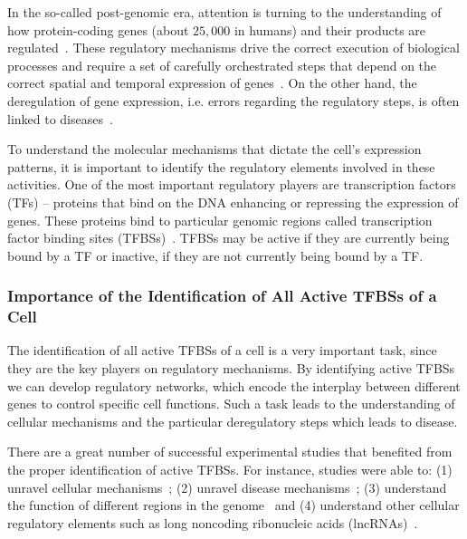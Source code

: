 In the so-called post-genomic era, attention is turning to the understanding of how protein-coding genes (about $25,000$ in humans) and their products are regulated~\citep{maston2006}. These regulatory mechanisms drive the correct execution of biological processes and require a set of carefully orchestrated steps that depend on the correct spatial and temporal expression of genes~\citep{maston2006}. On the other hand, the deregulation of gene expression, i.e. errors regarding the regulatory steps, is often linked to diseases~\citep{encode2012}.

To understand the molecular mechanisms that dictate the cell's expression patterns, it is important to identify the regulatory elements involved in these activities. One of the most important regulatory players are transcription factors (TFs) -- proteins that bind on the DNA enhancing or repressing the expression of genes. These proteins bind to particular genomic regions called transcription factor binding sites (TFBSs)~\citep{maston2006}. TFBSs may be active if they are currently being bound by a TF or inactive, if they are not currently being bound by a TF.

\subsubsection{Importance of the Identification of All Active TFBSs of a Cell}

The identification of all active TFBSs of a cell is a very important task, since they are the key players on regulatory mechanisms. By identifying active TFBSs we can develop regulatory networks, which encode the interplay between different genes to control specific cell functions. Such a task leads to the understanding of cellular mechanisms and the particular deregulatory steps which leads to disease.

There are a great number of successful experimental studies that benefited from the proper identification of active TFBSs. For instance, studies were able to: (1) unravel cellular mechanisms~\citep{lin2015,tsankov2015}; (2) unravel disease mechanisms~\citep{schaub2012,vernot2012,charos2012}; (3) understand the function of different regions in the genome~\citep{yip2012,whitfield2012,natarajan2012} and (4) understand other cellular regulatory elements such as long noncoding ribonucleic acids (lncRNAs)~\citep{tilgner2012,banfai2012}.

